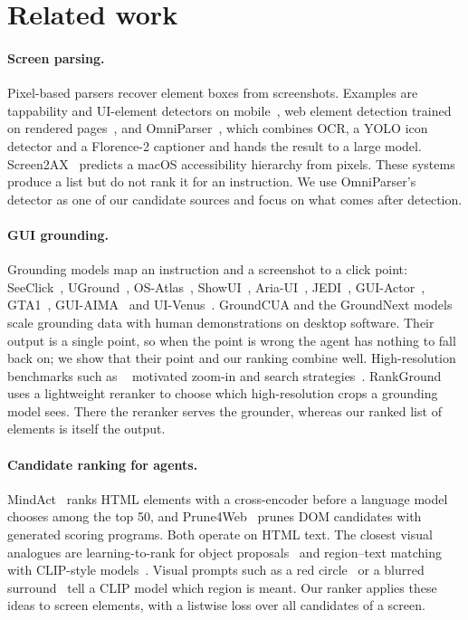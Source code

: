 \section{Related work}
\label{sec:related}

\paragraph{Screen parsing.}
Pixel-based parsers recover element boxes from screenshots. Examples are tappability and UI-element detectors on
mobile~\cite{swearngin2019tappability,zhang2021screenrecognition}, web element detection trained on rendered
pages~\cite{wu2023webui}, and OmniParser~\cite{lu2024omniparser}, which combines OCR, a YOLO icon detector and a
Florence-2 captioner and hands the result to a large model. Screen2AX~\cite{muryn2025screen2ax} predicts a macOS
accessibility hierarchy from pixels. These systems produce a list but do not rank it for an instruction. We use
OmniParser's detector as one of our candidate sources and focus on what comes after detection.

\paragraph{GUI grounding.}
Grounding models map an instruction and a screenshot to a click point:
SeeClick~\cite{cheng2024seeclick}, UGround~\cite{gou2025uground}, OS-Atlas~\cite{wu2024osatlas},
ShowUI~\cite{lin2025showui}, Aria-UI~\cite{yang2024ariaui}, JEDI~\cite{xie2025jedi}, GUI-Actor~\cite{wu2025guiactor},
GTA1~\cite{yang2025gta1}, GUI-AIMA~\cite{zhou2025guiaima} and UI-Venus~\cite{gu2025uivenus}. GroundCUA and the
GroundNext models~\cite{feizi2026groundcua} scale grounding data with human demonstrations on desktop software.
Their output is a single point, so when the point is wrong the agent has nothing to fall back on; we show that
their point and our ranking combine well. High-resolution benchmarks such as \sspro~\cite{li2025screenspotpro}
motivated zoom-in and search strategies~\cite{li2025screenspotpro,wu2025zoomclick}. RankGround~\cite{fan2026rankground}
uses a lightweight reranker to choose which high-resolution crops a grounding model sees. There the reranker serves
the grounder, whereas our ranked list of elements is itself the output.

\paragraph{Candidate ranking for agents.}
MindAct~\cite{deng2023mind2web} ranks HTML elements with a cross-encoder before a language model chooses among
the top 50, and Prune4Web~\cite{prune4web} prunes DOM candidates with generated scoring programs. Both operate on
HTML text. The closest visual analogues are learning-to-rank for object proposals~\cite{tan2019proposalrank} and
region--text matching with CLIP-style models~\cite{zhong2022regionclip,sun2024alphaclip}. Visual prompts such as a
red circle~\cite{shtedritski2023redcircle} or a blurred surround~\cite{yang2023fgvp} tell a CLIP model which region
is meant. Our ranker applies these ideas to screen elements, with a listwise loss over all candidates of a screen.
